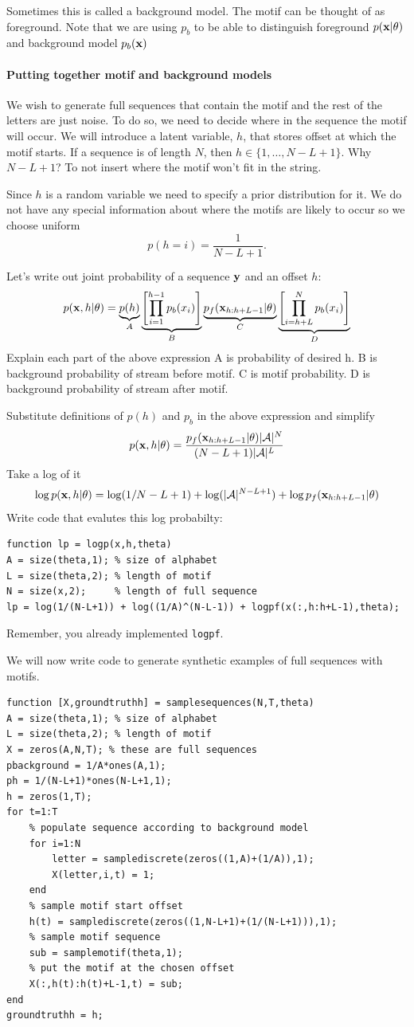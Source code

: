 \documentclass{article}
\begin{document}
{Sometimes this is called a background model. The motif can be thought of as foreground.
Note that we are using $p_b$ to be able to distinguish foreground $p(\mathbf{x}|\theta)$ and background model $p_b(\mathbf{x})$


\paragraph{Putting together motif and background models}
We wish to generate full sequences that contain the motif and the rest of the letters are just noise.
To do so, we need to decide where in the sequence the motif will occur. We will introduce a latent variable, $h$, that
stores offset at which the motif starts.  If a sequence is of length $N$, then $h \in  \{1,\dots,N-L+1\}$.
Why $N-L+1$? To not insert where the motif won't fit in the string.

Since $h$ is a random variable we need to specify a prior distribution for it. 
We do not have any special information about where the motifs are likely to occur so we choose uniform
\[
p(h = i) = \frac{1}{N-L+1}.
\]

Let's write out joint probability of a sequence $\mathbf{y}$ and an offset $h$:
\[
p(\mathbf{x},h|\theta) = \underbrace{p(h)}_A \underbrace{\left[\prod_{i=1}^{h-1} p_b(x_i)\right]}_{B}\underbrace{p_f(\mathbf{x}_{h:h+L-1}|\theta)}_{C}\underbrace{\left[\prod_{i=h+L}^{N} p_b(x_i)\right]}_{D}
\]
Explain each part of the above expression
A is probability of desired h.
B is background probability of stream before motif.
C is motif probability.
D is background probability of stream after motif.

Substitute definitions of $p(h)$ and $p_b$ in the above expression and simplify
\[
p(\mathbf{x},h|\theta) = \frac{p_f(\mathbf{x}_{h:h+L-1}|\theta)|\mathcal{A}|^N}{(N - L + 1)|\mathcal{A}|^L}
\]
Take a log of it
\[
\log p(\mathbf{x},h|\theta) = \log(1/N - L + 1) + \log(|\mathcal{A}|^{N - L + 1}) + \log p_f(\mathbf{x}_{h:h+L-1}|\theta)
\]
Write code that evalutes this log probabilty:
\begin{verbatim}
function lp = logp(x,h,theta)
A = size(theta,1); % size of alphabet
L = size(theta,2); % length of motif
N = size(x,2);     % length of full sequence
lp = log(1/(N-L+1)) + log((1/A)^(N-L-1)) + logpf(x(:,h:h+L-1),theta);
\end{verbatim}
Remember, you already implemented \verb|logpf|.

We will now write code to generate synthetic examples of full sequences with motifs.
\begin{verbatim}
function [X,groundtruthh] = samplesequences(N,T,theta)
A = size(theta,1); % size of alphabet
L = size(theta,2); % length of motif
X = zeros(A,N,T); % these are full sequences
pbackground = 1/A*ones(A,1);
ph = 1/(N-L+1)*ones(N-L+1,1);
h = zeros(1,T);
for t=1:T
    % populate sequence according to background model
    for i=1:N
        letter = samplediscrete(zeros((1,A)+(1/A)),1);
        X(letter,i,t) = 1;
    end
    % sample motif start offset
    h(t) = samplediscrete(zeros((1,N-L+1)+(1/(N-L+1))),1);
    % sample motif sequence
    sub = samplemotif(theta,1);
    % put the motif at the chosen offset
    X(:,h(t):h(t)+L-1,t) = sub;
end
groundtruthh = h;
\end{verbatim}

}
\end{document}
